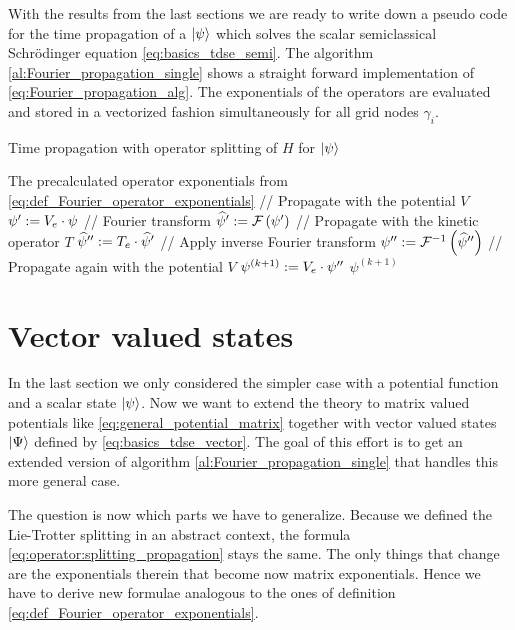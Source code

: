 With the results from the last sections we are ready to write down a pseudo code for the time
propagation of a $\Ket{\psi}$ which solves the scalar semiclassical Schrödinger
equation \eqref{eq:basics_tdse_semi}. The algorithm \ref{al:Fourier_propagation_single}
shows a straight forward implementation of \eqref{eq:Fourier_propagation_alg}. The
exponentials of the operators are evaluated and stored in a vectorized fashion
simultaneously for all grid nodes $\gamma_i$.

\begin{algorithm}
\caption{Time propagation with operator splitting of $H$ for $\Ket{\psi}$}
\label{al:Fourier_propagation_single}
\begin{algorithmic}
  \REQUIRE The precalculated operator exponentials from \eqref{eq:def_Fourier_operator_exponentials}
  \STATE // Propagate with the potential $V$
  \STATE $\psi^{\prime} := V_e \cdot \psi$
  \STATE // Fourier transform
  \STATE $\widehat{\psi}^{\prime} := \mathcal{F}\left(\psi^{\prime}\right)$
  \STATE // Propagate with the kinetic operator $T$
  \STATE $\widehat{\psi}^{\prime\prime} := T_e \cdot \widehat{\psi}^{\prime}$
  \STATE // Apply inverse Fourier transform
  \STATE $\psi^{\prime\prime} := \mathcal{F}^{-1}\left(\widehat{\psi}^{\prime\prime}\right)$
  \STATE // Propagate again with the potential $V$
  \STATE $\psi^{\left(k+1\right)} := V_e \cdot \psi^{\prime\prime}$
  \RETURN $\psi^{\left(k+1\right)}$
\end{algorithmic}
\end{algorithm}


\section{Vector valued states}

In the last section we only considered the simpler case with a potential function
and a scalar state $\Ket{\psi}$. Now we want to extend the theory to matrix
valued potentials like \eqref{eq:general_potential_matrix} together with vector
valued states $\Ket{\Psi}$ defined by \eqref{eq:basics_tdse_vector}. The goal of
this effort is to get an extended version of algorithm \ref{al:Fourier_propagation_single}
that handles this more general case.

The question is now which parts we have to generalize. Because we defined the
Lie-Trotter splitting in an abstract context, the formula \eqref{eq:operator:splitting_propagation}
stays the same. The only things that change are the exponentials therein that become
now matrix exponentials. Hence we have to derive new formulae analogous to the ones
of definition \eqref{eq:def_Fourier_operator_exponentials}.

